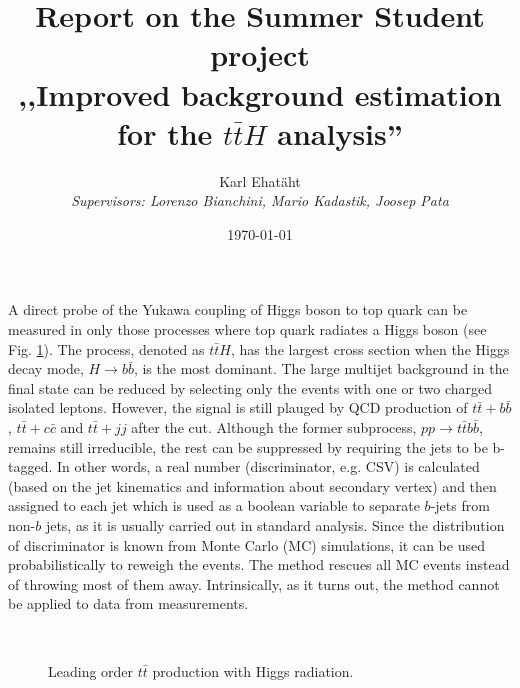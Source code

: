 \documentclass[12pt,a4paper]{article}
\title{\TitleFont\textbf{Report on the Summer Student project\\,,Improved background estimation for the $t\bar{t}H$ analysis''}}
\author{Karl Ehatäht\\[0.5em]
\textit{Supervisors: Lorenzo Bianchini, Mario Kadastik, Joosep Pata}}
\date\today
\begin{document}
\maketitle

A direct probe of the Yukawa coupling of Higgs boson to top quark can be measured in only those processes where top quark radiates a Higgs boson (see Fig. \ref{fig:ttH}).
The process, denoted as $t\bar{t}H$, has the largest cross section when the Higgs decay mode, $H \to b\bar{b}$, is the most dominant.
The large multijet background in the final state  can be reduced by selecting only the events with one or two charged isolated leptons.
However, the signal is still plauged by QCD production of $t\bar{t}+b\bar{b}$, $t\bar{t}+c\bar{c}$ and $t\bar{t}+jj$ after the cut.
Although the former subprocess, $pp\to t\bar{t}b\bar{b}$, remains still irreducible, the rest can be suppressed by requiring the jets to be b-tagged.
In other words, a real number (discriminator, e.g. CSV) is calculated (based on the jet kinematics and information about secondary vertex) and then assigned to each jet which is used as a boolean variable to separate $b$-jets from non-$b$ jets, as it is usually carried out in standard analysis.
Since the distribution of discriminator is known from Monte Carlo (MC) simulations, it can be used probabilistically to reweigh the events.
The method rescues all MC events instead of throwing most of them away.
Intrinsically, as it turns out, the method cannot be applied to data from measurements.
\vspace*{1em}
\begin{figure}[H]
	\begin{center}
	~~~~~~~~~~
	\caption{Leading order $t\bar{t}$ production with Higgs radiation.}
	\label{fig:ttH}
	\end{center}
\end{figure}
\end{document}
